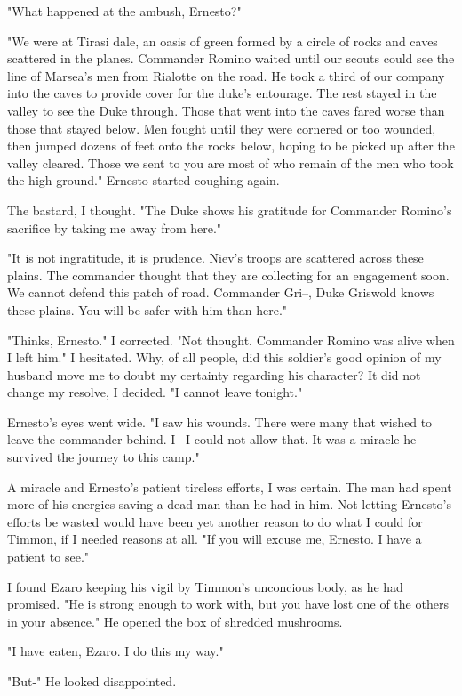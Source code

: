 \documentclass{article}
\begin{document}
"What happened at the ambush, Ernesto?"

"We were at Tirasi dale, an oasis of green formed by a circle of rocks and caves scattered in the planes. Commander Romino waited until our scouts could see the line of Marsea's men from Rialotte on the road. He took a third of our company into the caves to provide cover for the duke's entourage. The rest stayed in the valley to see the Duke through. Those that went into the caves fared worse than those that stayed below. Men fought until they were cornered or too wounded, then jumped dozens of feet onto the rocks below, hoping to be picked up after the valley cleared. Those we sent to you are most of who remain of the men who took the high ground." Ernesto started coughing again.

The bastard, I thought. "The Duke shows his gratitude for Commander Romino's sacrifice by taking me away from here."

"It is not ingratitude, it is prudence. Niev's troops are scattered across these plains. The commander thought that they are collecting for an engagement soon. We cannot defend this patch of road. Commander Gri--, Duke Griswold knows these plains. You will be safer with him than here."

"Thinks, Ernesto." I corrected. "Not thought. Commander Romino was alive when I left him." I hesitated. Why, of all people, did this soldier's good opinion of my husband move me to doubt my certainty regarding his character? It did not change my resolve, I decided. "I cannot leave tonight."

Ernesto's eyes went wide. "I saw his wounds. There were many that wished to leave the commander behind. I-- I could not allow that. It was a miracle he survived the journey to this camp."

A miracle and Ernesto's patient tireless efforts, I was certain. The man had spent more of his energies saving a dead man than he had in him. Not letting Ernesto's efforts be wasted would have been yet another reason to do what I could for Timmon, if I needed reasons at all. "If you will excuse me, Ernesto. I have a patient to see."

I found Ezaro keeping his vigil by Timmon's unconcious body, as he had promised. "He is strong enough to work with, but you have lost one of the others in your absence." He opened the box of shredded mushrooms.

"I have eaten, Ezaro. I do this my way."

"But-" He looked disappointed.
\end{document}
